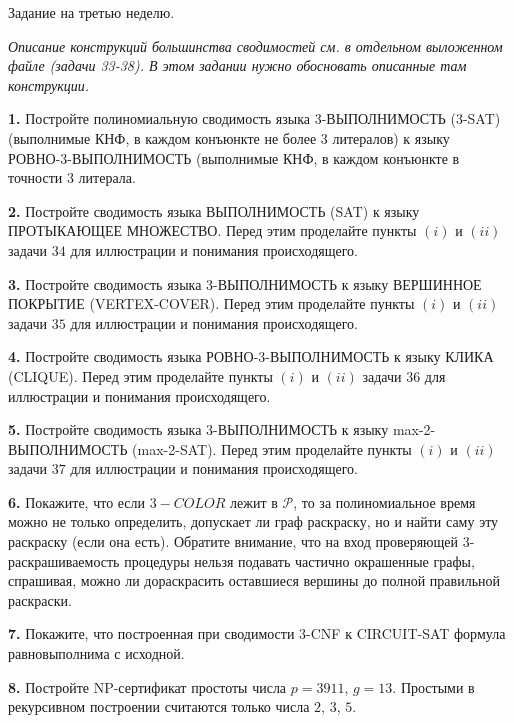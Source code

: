 \documentclass[12pt,a5paper,fleqn]{article}
\begin{document}
\smallskip

\newpage


\begin{center}
{ \Large Задание на третью неделю.}

\textit{Описание конструкций большинства сводимостей см. в отдельном выложенном файле (задачи 33-38). В этом задании нужно обосновать описанные там конструкции.}

\end{center}



{\bf 1.} Постройте полиномиальную сводимость языка 3-ВЫПОЛНИМОСТЬ (3-SAT) (выполнимые КНФ, в каждом конъюнкте не более 3 литералов) к языку РОВНО-3-ВЫПОЛНИМОСТЬ (выполнимые КНФ, в каждом конъюнкте в точности $3$ литерала.

\smallskip

{\bf 2.} Постройте сводимость языка ВЫПОЛНИМОСТЬ (SAT) к языку ПРОТЫКАЮЩЕЕ МНОЖЕСТВО. Перед этим проделайте пункты $(i)$ и $(ii)$ задачи $34$ для иллюстрации и понимания происходящего.

\smallskip

{\bf 3.} Постройте сводимость языка 3-ВЫПОЛНИМОСТЬ к языку ВЕРШИННОЕ ПОКРЫТИЕ (VERTEX-COVER). Перед этим проделайте пункты $(i)$ и $(ii)$ задачи $35$ для иллюстрации и понимания происходящего.

\smallskip

{\bf 4.} Постройте сводимость языка РОВНО-3-ВЫПОЛНИМОСТЬ к языку КЛИКА (CLIQUE). Перед этим проделайте пункты $(i)$ и $(ii)$ задачи $36$ для иллюстрации и понимания происходящего.

\smallskip

{\bf 5.} Постройте сводимость языка 3-ВЫПОЛНИМОСТЬ к языку max-2-ВЫПОЛНИМОСТЬ (max-2-SAT). Перед этим проделайте пункты $(i)$ и $(ii)$ задачи $37$ для иллюстрации и понимания происходящего.

\smallskip

{\bf 6.} Покажите, что если $3-COLOR$ лежит в $\mathcal{P}$, то за полиномиальное время можно не только определить, допускает ли граф раскраску, но и найти саму эту раскраску (если она есть). Обратите внимание, что на вход проверяющей 3-раскрашиваемость процедуры нельзя подавать частично окрашенные графы, спрашивая, можно ли дораскрасить оставшиеся вершины до полной правильной раскраски.

\smallskip

{\bf 7.} Покажите, что построенная при сводимости 3-CNF к CIRCUIT-SAT формула равновыполнима с исходной. 

\smallskip

{\bf 8.} Постройте NP-сертификат простоты числа $p = 3911$, $g = 13$. Простыми в рекурсивном построении считаются только числа $2$, $3$, $5$.

\smallskip
\end{document}
